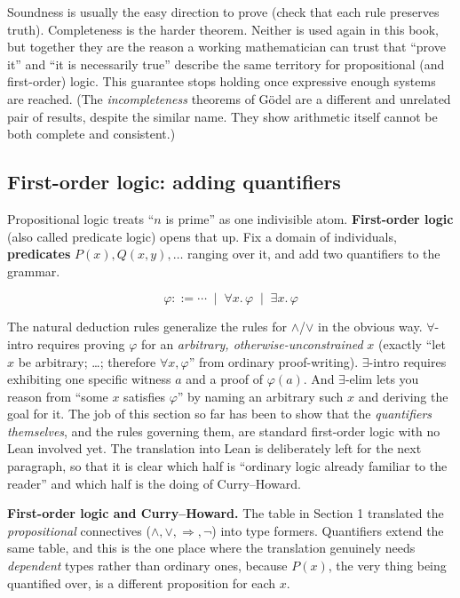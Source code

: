 Soundness is usually the easy direction to prove (check that each rule preserves truth). Completeness is the harder theorem. Neither is used again in this book, but together they are the reason a working mathematician can trust that ``prove it'' and ``it is necessarily true'' describe the same territory for propositional (and first-order) logic. This guarantee stops holding once expressive enough systems are reached. (The \emph{incompleteness} theorems of Gödel are a different and unrelated pair of results, despite the similar name. They show arithmetic itself cannot be both complete and consistent.)

\subsection{First-order logic: adding quantifiers}\label{sec:04-propositions-and-proofs:02-logic-recap:6}

Propositional logic treats ``\(n\) is prime'' as one indivisible atom. \textbf{First-order logic} (also called predicate logic) opens that up. Fix a domain of individuals, \textbf{predicates} \(P(x), Q(x, y), \dots\) ranging over it, and add two quantifiers to the grammar.

\[
\varphi ::= \cdots \;\mid\; \forall x.\, \varphi \;\mid\; \exists x.\, \varphi
\]

The natural deduction rules generalize the rules for \(\wedge\)/\(\vee\) in the obvious way. \(\forall\)-intro requires proving \(\varphi\) for an \emph{arbitrary, otherwise-unconstrained} \(x\) (exactly ``let \(x\) be arbitrary; \ldots; therefore \(\forall x, \varphi\)'' from ordinary proof-writing). \(\exists\)-intro requires exhibiting one specific witness \(a\) and a proof of \(\varphi(a)\). And \(\exists\)-elim lets you reason from ``some \(x\) satisfies \(\varphi\)'' by naming an arbitrary such \(x\) and deriving the goal for it. The job of this section so far has been to show that the \emph{quantifiers themselves}, and the rules governing them, are standard first-order logic with no Lean involved yet. The translation into Lean is deliberately left for the next paragraph, so that it is clear which half is ``ordinary logic already familiar to the reader'' and which half is the doing of Curry--Howard.

\textbf{First-order logic and Curry--Howard.} The table in Section 1 translated the \emph{propositional} connectives (\(\wedge, \vee, \Rightarrow, \neg\)) into type formers. Quantifiers extend the same table, and this is the one place where the translation genuinely needs \emph{dependent} types rather than ordinary ones, because \(P(x)\), the very thing being quantified over, is a different proposition for each \(x\).

